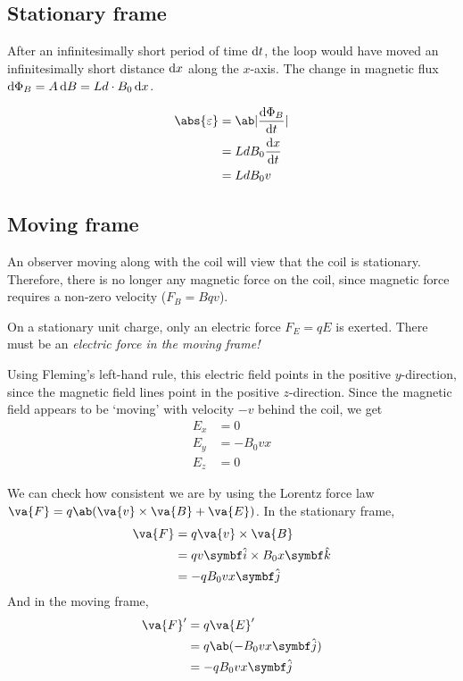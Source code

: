\subsection{Stationary frame}
After an infinitesimally short period of time \(\odif{t}\), the loop would have moved an
infinitesimally short distance \(\odif{x}\) along the \(x\)-axis.
The change in magnetic flux \(\odif{\Phi_B} = A\odif{B} = Ld\cdot B_0\odif{x}\).

\begin{align*}
	\abs{\varepsilon} & = \ab|\odv{\Phi_B}{t}| \\
	                  & = LdB_0\odv{x}{t}      \\
	                  & = LdB_0v
\end{align*}

\subsection{Moving frame}
An observer moving along with the coil will view that the coil is stationary.
Therefore, there is no longer any magnetic force on the coil, since magnetic force
requires a non-zero velocity (\(F_B = Bqv\)).

On a stationary unit charge, only an electric force \(F_E = qE\) is exerted.
There must be an \it{electric force} in the moving frame!

Using Fleming's left-hand rule, this electric field points in the
positive \(y\)-direction, since the magnetic field lines point in the
positive \(z\)-direction.
Since the magnetic field appears to be `moving' with velocity \(-v\) behind
the coil, we get
\begin{align*}
	E_x & = 0      \\
	E_y & = -B_0vx \\
	E_z & = 0
\end{align*}

We can check how consistent we are by using the Lorentz force law \(\va{F} = q\ab(\va{v}\times\va{B}+\va{E})\).
In the stationary frame,
\begin{align*}
	\va{F} & = q\va{v}\times\va{B}  \\
	       & = qv\ii \times B_0x\kk \\
	       & = -qB_0vx\jj
\end{align*}
And in the moving frame,
\begin{align*}
	\va{F}' & = q\va{E}'        \\
	        & = q\ab(-B_0vx\jj) \\
	        & = -qB_0vx\jj
\end{align*}


